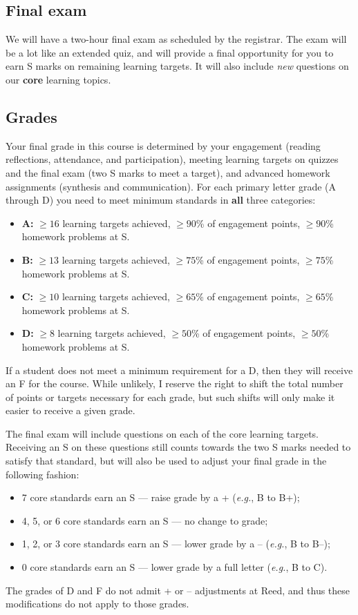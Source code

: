 \documentclass[11pt,twoside]{amsart}
\begin{document}
\subsection*{Final exam}
We will have a two-hour final exam as scheduled by the registrar. The exam will be a lot like an extended quiz, and will provide a final opportunity for you to earn S marks on remaining learning targets. It will also include \emph{new} questions on our \textbf{core} learning topics.

\subsection*{Grades}\label{grading}
Your final grade in this course is determined by your engagement (reading reflections, attendance, and participation), meeting learning targets on quizzes and the final exam (two S marks to meet a target), and advanced homework assignments (synthesis and communication). For each primary letter grade (A through D) you need to meet minimum standards in \textbf{all} three categories:
\begin{itemize}
\item \textbf{A:} $\ge 16$ learning targets achieved, $\ge 90$\% of engagement points, $\ge 90$\% homework problems at S.
\item \textbf{B:} $\ge 13$ learning targets achieved, $\ge 75$\% of engagement points, $\ge 75$\% homework problems at S.
\item \textbf{C:} $\ge 10$ learning targets achieved, $\ge 65$\% of engagement points, $\ge 65$\% homework problems at S.
\item \textbf{D:} $\ge 8$ learning targets achieved, $\ge 50$\% of engagement points, $\ge 50$\% homework problems at S.
\end{itemize}
If a student does not meet a minimum requirement for a D, then they will receive an F for the course. While unlikely, I reserve the right to shift the total number of points or targets necessary for each grade, but such shifts will only make it easier to receive a given grade.

The final exam will include questions on each of the core learning targets. Receiving an S on these questions still counts towards the two S marks needed to satisfy that standard, but will also be used to adjust your final grade in the following fashion:
\begin{itemize}
\item 7 core standards earn an S --- raise grade by a + (\emph{e.g.}, B to B+);
\item 4, 5, or 6 core standards earn an S --- no change to grade;
\item 1, 2, or 3 core standards earn an S --- lower grade by a -- (\emph{e.g.}, B to B--);
\item 0 core standards earn an S --- lower grade by a full letter (\emph{e.g.}, B to C).
\end{itemize}
The grades of D and F do not admit + or -- adjustments at Reed, and thus these modifications do not apply to those grades.
\end{document}
